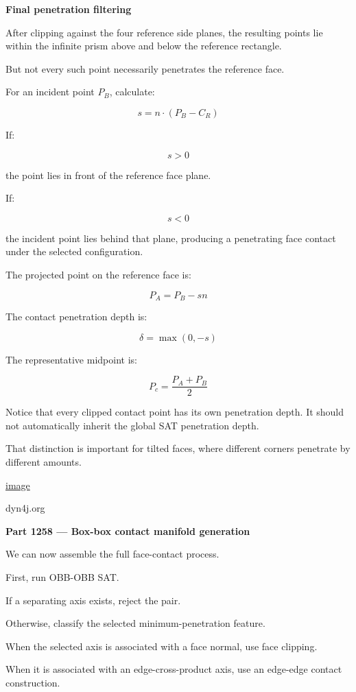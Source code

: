 \textbf{Final penetration filtering}

After clipping against the four reference side planes, the resulting points lie within the infinite prism above and below the reference rectangle.

But not every such point necessarily penetrates the reference face.

For an incident point \(P_B\), calculate:

\[
\boxed{ s=n\cdot(P_B-C_R) }
\]

If:

\[
s>0
\]

the point lies in front of the reference face plane.

If:

\[
s<0
\]

the incident point lies behind that plane, producing a penetrating face contact under the selected configuration.

The projected point on the reference face is:

\[
\boxed{ P_A=P_B-sn }
\]

The contact penetration depth is:

\[
\boxed{ \delta=\max(0,-s) }
\]

The representative midpoint is:

\[
\boxed{ P_c=\frac{P_A+P_B}{2} }
\]

Notice that every clipped contact point has its own penetration depth. It should not automatically inherit the global SAT penetration depth.

That distinction is important for tilted faces, where different corners penetrate by different amounts. 

\href{https://www.google.com/s2/favicons?domain=https://dyn4j.org&sz=32}{image}

dyn4j.org

\textbf{Part 1258 --- Box-box contact manifold generation}

We can now assemble the full face-contact process.

First, run OBB-OBB SAT.

If a separating axis exists, reject the pair.

Otherwise, classify the selected minimum-penetration feature.

When the selected axis is associated with a face normal, use face clipping.

When it is associated with an edge-cross-product axis, use an edge-edge contact construction.


